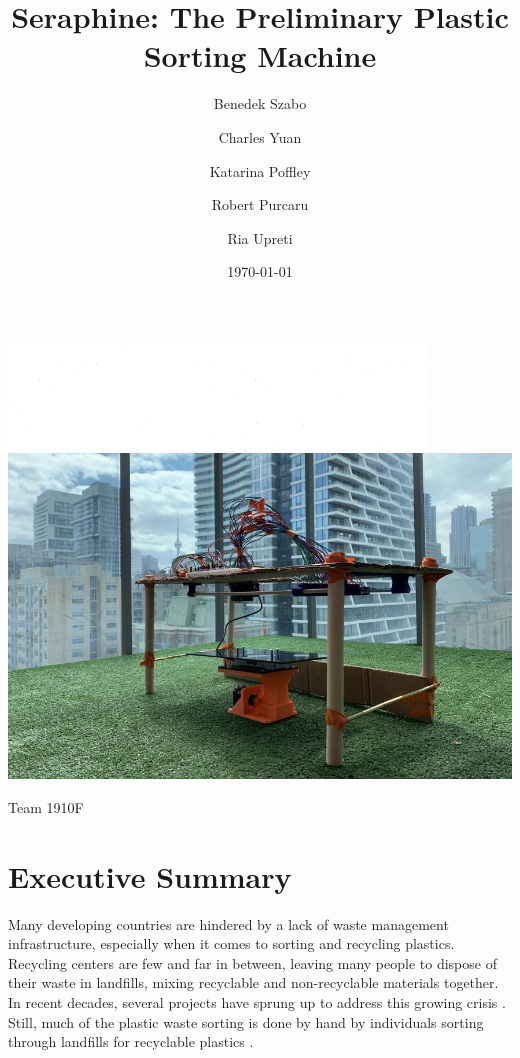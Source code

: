 \documentclass[12pt]{article}
\begin{document}
    \title{Seraphine: The Preliminary Plastic Sorting Machine}
    \author{Benedek Szabo
        \and Charles Yuan
        \and Katarina Poffley
        \and Robert Purcaru
        \and Ria Upreti
    }
    \date{\today}
    \maketitle

    \includegraphics[width=\linewidth]{White.png}
    \includegraphics[width=\linewidth]{CN.png}

    \begin{center}
        Team 1910F
    \end{center}


    \newpage

    \section*{Executive Summary}
        Many developing countries are hindered by a lack of waste management infrastructure, especially when it comes to sorting and recycling plastics. Recycling centers are few and far in between, leaving many people to dispose of their waste in landfills, mixing recyclable and non-recyclable materials together. In recent decades, several projects have sprung up to address this growing crisis \cite{wansi_2022} \cite{dow_2022}. Still, much of the plastic waste sorting is done by hand by individuals sorting through landfills for recyclable plastics \cite{GhanaSorting}.
\end{document}
